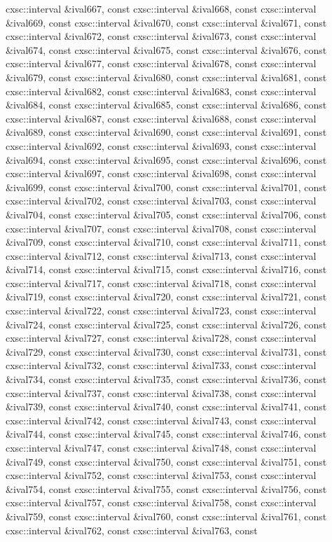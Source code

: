 \begin{DoxyCompactItemize}
cxsc\-::interval \&ival667, const cxsc\-::interval \&ival668, const cxsc\-::interval \&ival669, const cxsc\-::interval \&ival670, const cxsc\-::interval \&ival671, const cxsc\-::interval \&ival672, const cxsc\-::interval \&ival673, const cxsc\-::interval \&ival674, const cxsc\-::interval \&ival675, const cxsc\-::interval \&ival676, const cxsc\-::interval \&ival677, const cxsc\-::interval \&ival678, const cxsc\-::interval \&ival679, const cxsc\-::interval \&ival680, const cxsc\-::interval \&ival681, const cxsc\-::interval \&ival682, const cxsc\-::interval \&ival683, const cxsc\-::interval \&ival684, const cxsc\-::interval \&ival685, const cxsc\-::interval \&ival686, const cxsc\-::interval \&ival687, const cxsc\-::interval \&ival688, const cxsc\-::interval \&ival689, const cxsc\-::interval \&ival690, const cxsc\-::interval \&ival691, const cxsc\-::interval \&ival692, const cxsc\-::interval \&ival693, const cxsc\-::interval \&ival694, const cxsc\-::interval \&ival695, const cxsc\-::interval \&ival696, const cxsc\-::interval \&ival697, const cxsc\-::interval \&ival698, const cxsc\-::interval \&ival699, const cxsc\-::interval \&ival700, const cxsc\-::interval \&ival701, const cxsc\-::interval \&ival702, const cxsc\-::interval \&ival703, const cxsc\-::interval \&ival704, const cxsc\-::interval \&ival705, const cxsc\-::interval \&ival706, const cxsc\-::interval \&ival707, const cxsc\-::interval \&ival708, const cxsc\-::interval \&ival709, const cxsc\-::interval \&ival710, const cxsc\-::interval \&ival711, const cxsc\-::interval \&ival712, const cxsc\-::interval \&ival713, const cxsc\-::interval \&ival714, const cxsc\-::interval \&ival715, const cxsc\-::interval \&ival716, const cxsc\-::interval \&ival717, const cxsc\-::interval \&ival718, const cxsc\-::interval \&ival719, const cxsc\-::interval \&ival720, const cxsc\-::interval \&ival721, const cxsc\-::interval \&ival722, const cxsc\-::interval \&ival723, const cxsc\-::interval \&ival724, const cxsc\-::interval \&ival725, const cxsc\-::interval \&ival726, const cxsc\-::interval \&ival727, const cxsc\-::interval \&ival728, const cxsc\-::interval \&ival729, const cxsc\-::interval \&ival730, const cxsc\-::interval \&ival731, const cxsc\-::interval \&ival732, const cxsc\-::interval \&ival733, const cxsc\-::interval \&ival734, const cxsc\-::interval \&ival735, const cxsc\-::interval \&ival736, const cxsc\-::interval \&ival737, const cxsc\-::interval \&ival738, const cxsc\-::interval \&ival739, const cxsc\-::interval \&ival740, const cxsc\-::interval \&ival741, const cxsc\-::interval \&ival742, const cxsc\-::interval \&ival743, const cxsc\-::interval \&ival744, const cxsc\-::interval \&ival745, const cxsc\-::interval \&ival746, const cxsc\-::interval \&ival747, const cxsc\-::interval \&ival748, const cxsc\-::interval \&ival749, const cxsc\-::interval \&ival750, const cxsc\-::interval \&ival751, const cxsc\-::interval \&ival752, const cxsc\-::interval \&ival753, const cxsc\-::interval \&ival754, const cxsc\-::interval \&ival755, const cxsc\-::interval \&ival756, const cxsc\-::interval \&ival757, const cxsc\-::interval \&ival758, const cxsc\-::interval \&ival759, const cxsc\-::interval \&ival760, const cxsc\-::interval \&ival761, const cxsc\-::interval \&ival762, const cxsc\-::interval \&ival763, const 
\end{DoxyCompactItemize}
